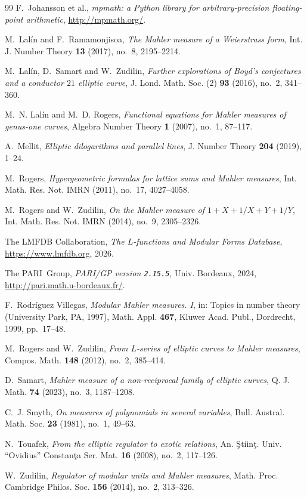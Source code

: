 \documentclass[11pt]{amsart}
\theoremstyle{definition}
\theoremstyle{remark}
\begin{document}
\begin{thebibliography}{99}
F.~Johansson et al.,
\emph{mpmath: a Python library for arbitrary-precision floating-point
arithmetic}, \url{http://mpmath.org/}.

M.~Lal\'in and F.~Ramamonjisoa,
\emph{The Mahler measure of a Weierstrass form},
Int. J. Number Theory \textbf{13} (2017), no.~8, 2195--2214.

M.~Lal\'in, D.~Samart and W.~Zudilin,
\emph{Further explorations of Boyd's conjectures and a conductor $21$
elliptic curve},
J. Lond. Math. Soc. (2) \textbf{93} (2016), no.~2, 341--360.

M.~N. Lal\'in and M.~D. Rogers,
\emph{Functional equations for Mahler measures of genus-one curves},
Algebra Number Theory \textbf{1} (2007), no.~1, 87--117.

A.~Mellit,
\emph{Elliptic dilogarithms and parallel lines},
J. Number Theory \textbf{204} (2019), 1--24.

M.~Rogers,
\emph{Hypergeometric formulas for lattice sums and Mahler measures},
Int. Math. Res. Not. IMRN (2011), no.~17, 4027--4058.

M.~Rogers and W.~Zudilin,
\emph{On the Mahler measure of $1+X+1/X+Y+1/Y$},
Int. Math. Res. Not. IMRN (2014), no.~9, 2305--2326.

The LMFDB Collaboration,
\emph{The $L$-functions and Modular Forms Database},
\url{https://www.lmfdb.org}, 2026.

The PARI~Group,
\emph{PARI/GP version \texttt{2.15.5}},
Univ. Bordeaux, 2024, \url{http://pari.math.u-bordeaux.fr/}.

F.~Rodr\'iguez Villegas,
\emph{Modular Mahler measures. I},
in: Topics in number theory (University Park, PA, 1997),
Math. Appl. \textbf{467}, Kluwer Acad. Publ., Dordrecht, 1999, pp.~17--48.

M.~Rogers and W.~Zudilin,
\emph{From $L$-series of elliptic curves to Mahler measures},
Compos. Math. \textbf{148} (2012), no.~2, 385--414.

D.~Samart,
\emph{Mahler measure of a non-reciprocal family of elliptic curves},
Q. J. Math. \textbf{74} (2023), no.~3, 1187--1208.

C.~J. Smyth,
\emph{On measures of polynomials in several variables},
Bull. Austral. Math. Soc. \textbf{23} (1981), no.~1, 49--63.

N.~Touafek,
\emph{From the elliptic regulator to exotic relations},
An. \c Stiin\c t. Univ. ``Ovidius'' Constan\c ta Ser. Mat. \textbf{16}
(2008), no.~2, 117--126.

W.~Zudilin,
\emph{Regulator of modular units and Mahler measures},
Math. Proc. Cambridge Philos. Soc. \textbf{156} (2014), no.~2, 313--326.

\end{thebibliography}
\end{document}
